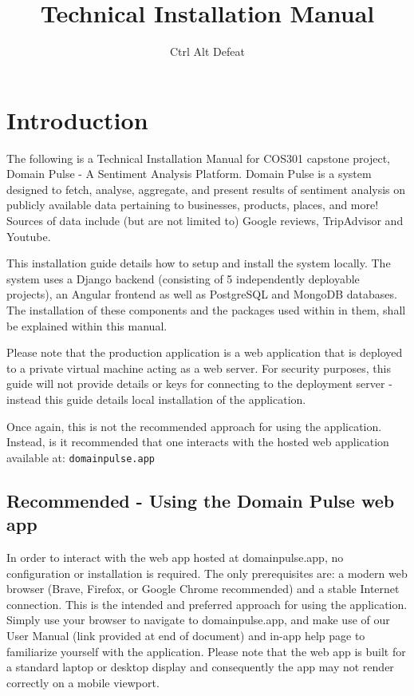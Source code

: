 \documentclass[12pt]{article}
\title{Technical Installation Manual}
\author{Ctrl Alt Defeat}
\begin{document}
\maketitle

\tableofcontents


\section{Introduction}
The following is a Technical Installation Manual for COS301 capstone project, Domain Pulse - A Sentiment Analysis Platform. Domain Pulse is
a system designed to fetch, analyse, aggregate, and present results of sentiment analysis on publicly available data pertaining to
businesses, products, places, and more! Sources of data include (but are not limited to) Google reviews, TripAdvisor and Youtube.

This installation guide details how to setup and install the system locally. The system uses a Django backend (consisting of 5 independently deployable projects),
an Angular frontend as well as PostgreSQL and MongoDB databases. The installation of these components and the packages used within in
them, shall be explained within this manual.

Please note that the production application is a web application that is deployed to a private virtual machine acting as a web server. For
security purposes, this guide will not provide details or keys for connecting to the deployment server - instead this guide details local installation
of the application.

Once again, this is not the recommended approach for using the application. Instead, is it recommended that one interacts with the hosted web
application available at: \texttt{domainpulse.app}

\subsection{Recommended - Using the Domain Pulse web app}
In order to interact with the web app hosted at domainpulse.app, no configuration or installation is required. The only
prerequisites are: a modern web browser (Brave, Firefox, or Google Chrome recommended) and a stable Internet connection. This is the
intended and preferred approach for using the application. Simply use your browser to navigate to domainpulse.app, and make use of
our User Manual (link provided at end of document) and in-app help page to familiarize yourself with the application. Please note that
the web app is built for a standard laptop or desktop display and consequently the app may not render correctly on a mobile viewport.
\end{document}
